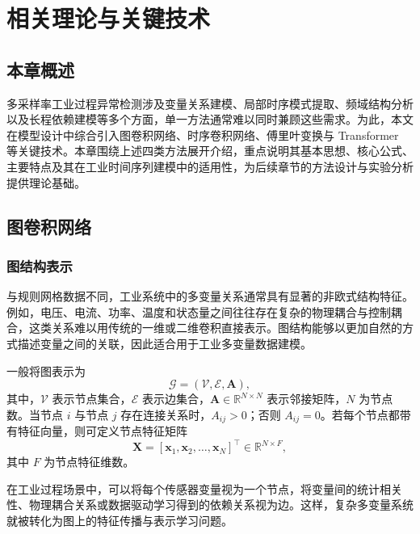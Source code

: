 
\chapter{相关理论与关键技术}
\label{chap:theory}

\section{本章概述}

多采样率工业过程异常检测涉及变量关系建模、局部时序模式提取、频域结构分析以及长程依赖建模等多个方面，单一方法通常难以同时兼顾这些需求。为此，本文在模型设计中综合引入图卷积网络、时序卷积网络、傅里叶变换与 Transformer 等关键技术。本章围绕上述四类方法展开介绍，重点说明其基本思想、核心公式、主要特点及其在工业时间序列建模中的适用性，为后续章节的方法设计与实验分析提供理论基础。

\section{图卷积网络}

\subsection{图结构表示}

与规则网格数据不同，工业系统中的多变量关系通常具有显著的非欧式结构特征。例如，电压、电流、功率、温度和状态量之间往往存在复杂的物理耦合与控制耦合，这类关系难以用传统的一维或二维卷积直接表示。图结构能够以更加自然的方式描述变量之间的关联，因此适合用于工业多变量数据建模。

一般将图表示为
\begin{equation}
    \mathcal{G} = (\mathcal{V}, \mathcal{E}, \mathbf{A}),
\end{equation}
其中，$\mathcal{V}$ 表示节点集合，$\mathcal{E}$ 表示边集合，$\mathbf{A} \in \mathbb{R}^{N \times N}$ 表示邻接矩阵，$N$ 为节点数。当节点 $i$ 与节点 $j$ 存在连接关系时，$A_{ij} > 0$；否则 $A_{ij} = 0$。若每个节点都带有特征向量，则可定义节点特征矩阵
\begin{equation}
    \mathbf{X} = [\mathbf{x}_1, \mathbf{x}_2, \ldots, \mathbf{x}_N]^\top \in \mathbb{R}^{N \times F},
\end{equation}
其中 $F$ 为节点特征维数。

在工业过程场景中，可以将每个传感器变量视为一个节点，将变量间的统计相关性、物理耦合关系或数据驱动学习得到的依赖关系视为边。这样，复杂多变量系统就被转化为图上的特征传播与表示学习问题。

